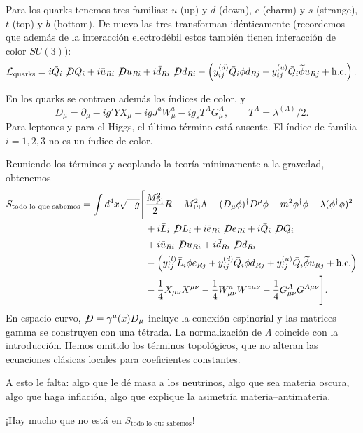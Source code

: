 \documentclass[11pt,a4paper]{article}
\newcommand{\hc}{\mathrm{h.c.}}
\begin{document}
Para los quarks tenemos tres familias: $u$ (up) y $d$ (down), $c$ (charm) y
$s$ (strange), $t$ (top) y $b$ (bottom). De nuevo las tres transforman
idénticamente (recordemos que además de la interacción electrodébil estos
también tienen interacción de color $SU(3)$):
\[
  \mathcal L_{\mathrm{quarks}}
  =i\bar Q_i\not\!D Q_i
   +i\bar u_{Ri}\not\!D u_{Ri}
   +i\bar d_{Ri}\not\!D d_{Ri}
   -\left(
     y_{ij}^{(d)}\bar Q_i\phi d_{Rj}
     +y_{ij}^{(u)}\bar Q_i\widetilde\phi u_{Rj}
     +\hc\right).
\]

En los quarks se contraen además los índices de color, y
\[
  D_\mu=\partial_\mu-ig'YX_\mu-igJ^aW_\mu^a
        -ig_sT^AG_\mu^A,
  \qquad T^A=\lambda^{(A)}/2.
\]
Para leptones y para el Higgs, el último término está ausente.
El índice de familia $i=1,2,3$ no es un índice de color.

Reuniendo los términos y acoplando la teoría mínimamente a la gravedad,
obtenemos
\begin{align*}
  S_{\text{todo lo que sabemos}}
  =\int d^4x\sqrt{-g}\Bigg[&
    \frac{M_{\mathrm{Pl}}^2}{2}R-M_{\mathrm{Pl}}^2\Lambda
    -(D_\mu\phi)^\dagger D^\mu\phi
    -m^2\phi^\dagger\phi
    -\lambda(\phi^\dagger\phi)^2\\
  &+i\bar L_i\not\!D L_i+i\bar e_{Ri}\not\!D e_{Ri}
    +i\bar Q_i\not\!D Q_i\\
  &+i\bar u_{Ri}\not\!D u_{Ri}
    +i\bar d_{Ri}\not\!D d_{Ri}\\
  &-\Bigl(
    y_{ij}^{(l)}\bar L_i\phi e_{Rj}
    +y_{ij}^{(d)}\bar Q_i\phi d_{Rj}
    +y_{ij}^{(u)}\bar Q_i\widetilde\phi u_{Rj}
    +\hc\Bigr)\\
  &-\frac14X_{\mu\nu}X^{\mu\nu}
    -\frac14W_{\mu\nu}^aW^{a\mu\nu}
    -\frac14G_{\mu\nu}^AG^{A\mu\nu}
  \Bigg].
\end{align*}
En espacio curvo, $\not\!D=\gamma^\mu(x)D_\mu$ incluye la conexión
espinorial y las matrices gamma se construyen con una tétrada.
La normalización de $\Lambda$ coincide con la introducción.
Hemos omitido los términos topológicos, que no alteran las ecuaciones
clásicas locales para coeficientes constantes.

A esto le falta: algo que le dé masa a los neutrinos, algo que sea materia
oscura, algo que haga inflación, algo que explique la asimetría
materia--antimateria.

¡Hay mucho que no está en $S_{\text{todo lo que sabemos}}$!
\end{document}
